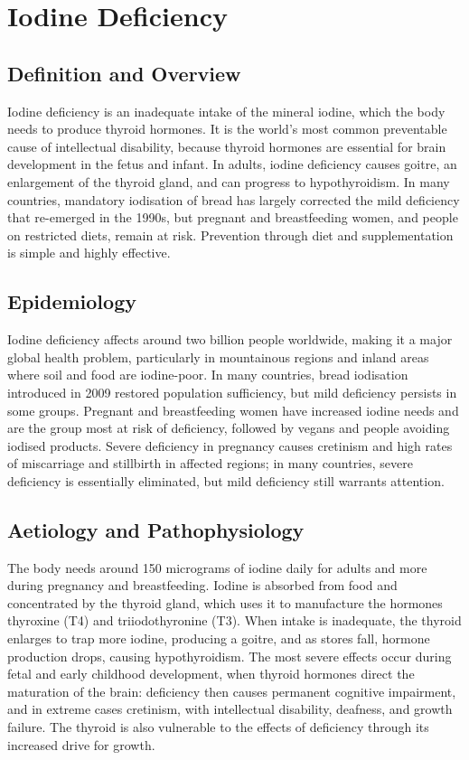 \chapter{Iodine Deficiency}

\section*{Definition and Overview}
Iodine deficiency is an inadequate intake of the mineral iodine, which the body needs to produce thyroid hormones. It is the world's most common preventable cause of intellectual disability, because thyroid hormones are essential for brain development in the fetus and infant. In adults, iodine deficiency causes goitre, an enlargement of the thyroid gland, and can progress to hypothyroidism. In many countries, mandatory iodisation of bread has largely corrected the mild deficiency that re-emerged in the 1990s, but pregnant and breastfeeding women, and people on restricted diets, remain at risk. Prevention through diet and supplementation is simple and highly effective.

\section*{Epidemiology}
Iodine deficiency affects around two billion people worldwide, making it a major global health problem, particularly in mountainous regions and inland areas where soil and food are iodine-poor. In many countries, bread iodisation introduced in 2009 restored population sufficiency, but mild deficiency persists in some groups. Pregnant and breastfeeding women have increased iodine needs and are the group most at risk of deficiency, followed by vegans and people avoiding iodised products. Severe deficiency in pregnancy causes cretinism and high rates of miscarriage and stillbirth in affected regions; in many countries, severe deficiency is essentially eliminated, but mild deficiency still warrants attention.

\section*{Aetiology and Pathophysiology}
The body needs around 150 micrograms of iodine daily for adults and more during pregnancy and breastfeeding. Iodine is absorbed from food and concentrated by the thyroid gland, which uses it to manufacture the hormones thyroxine (T4) and triiodothyronine (T3). When intake is inadequate, the thyroid enlarges to trap more iodine, producing a goitre, and as stores fall, hormone production drops, causing hypothyroidism. The most severe effects occur during fetal and early childhood development, when thyroid hormones direct the maturation of the brain: deficiency then causes permanent cognitive impairment, and in extreme cases cretinism, with intellectual disability, deafness, and growth failure. The thyroid is also vulnerable to the effects of deficiency through its increased drive for growth.

